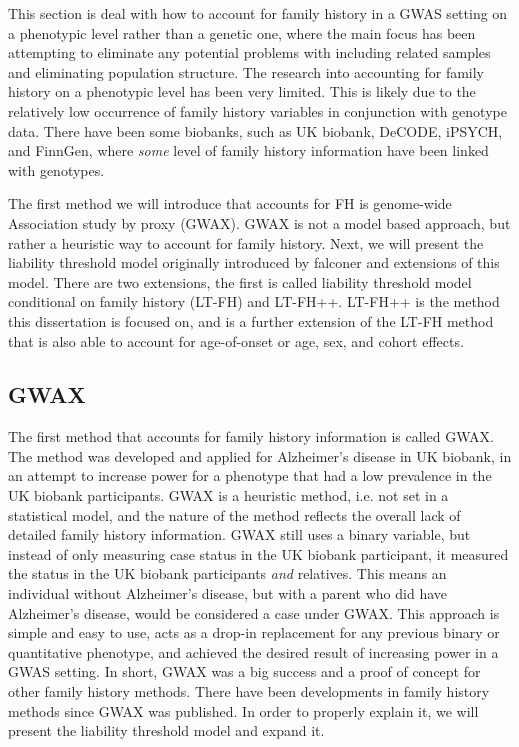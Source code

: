 
This section is deal with how to account for family history in a GWAS setting on a phenotypic level rather than a genetic one, where the main focus has been attempting to eliminate any potential problems with including related samples and eliminating population structure. The research into accounting for family history on a phenotypic level has been very limited. This is likely due to the relatively low occurrence of family history variables in conjunction with genotype data. There have been some biobanks, such as UK biobank, DeCODE, iPSYCH, and FinnGen, where \textit{some} level of family history information have been linked with genotypes. 

The first method we will introduce that accounts for FH is genome-wide Association study by proxy (GWAX). GWAX is not a model based approach, but rather a heuristic way to account for family history. Next, we will present the liability threshold model originally introduced by falconer\cite{falconer1965inheritance} and extensions of this model. There are two extensions, the first is called liability threshold model conditional on family history (LT-FH)\cite{hujoel2020liability} and LT-FH++. LT-FH++ is the method this dissertation is focused on, and is a further extension of the LT-FH method that is also able to account for age-of-onset or age, sex, and cohort effects. 

\subsection{GWAX}
The first method that accounts for family history information is called GWAX. The method was developed and applied for Alzheimer's disease in UK biobank, in an attempt to increase power for a phenotype that had a low prevalence in the UK biobank participants. GWAX is a heuristic method, i.e. not set in a statistical model, and the nature of the method reflects the overall lack of detailed family history information. GWAX still uses a binary variable, but instead of only measuring case status in the UK biobank participant, it measured the status in the UK biobank participants \textit{and} relatives. This means an individual without Alzheimer's disease, but with a parent who did have Alzheimer's disease, would be considered a case under GWAX. This approach is simple and easy to use, acts as a drop-in replacement for any previous binary or quantitative phenotype, and achieved the desired result of increasing power in a GWAS setting. In short, GWAX was a big success and a proof of concept for other family history methods. There have been developments in family history methods since GWAX was published. In order to properly explain it, we will present the liability threshold model and expand it.


